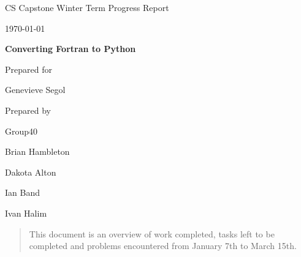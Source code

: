 \documentclass[onecolumn, draftclsnofoot,10pt, compsoc]{IEEEtran}
\def \CapstoneTeamName{The Cleverly Named Team}
\def \CapstoneTeamNumber{40}
\def \GroupMemberOne{Brian Hambleton}
\def \GroupMemberTwo{Dakota Alton}
\def \GroupMemberThree{Ian Band}
\def \GroupMemberFour{Ivan Halim}
\def \CapstoneProjectName{Converting Fortran to Python}
\def \CapstoneSponsorPerson{Genevieve Segol}
\def \DocType{Winter Term Progress Report}
\newcommand{\NameSigPair}[1]{\par
\makebox[2.75in][r]{#1} \hfil 	\makebox[3.25in]{\makebox[2.25in]{\hrulefill} \hfill		\makebox[.75in]{\hrulefill}}
\par\vspace{-12pt} \textit{\tiny\noindent
\makebox[2.75in]{} \hfil		\makebox[3.25in]{\makebox[2.25in][r]{Signature} \hfill	\makebox[.75in][r]{Date}}}}
\renewcommand{\NameSigPair}[1]{#1}
\begin{document}
\begin{titlepage}
    \begin{singlespace}
        \hfill 
        \par\vspace{.2in}
        \centering
        \scshape{
            \huge CS Capstone \DocType \par
            {\large\today}\par
            \vspace{.5in}
            \textbf{\Huge\CapstoneProjectName}\par
            \vfill
            {\large Prepared for}\par
            {\Huge\NameSigPair{\CapstoneSponsorPerson}\par}
            {\large Prepared by }\par
            Group\CapstoneTeamNumber\par
            \vspace{5pt}
            {\Large
                \NameSigPair{\GroupMemberOne}\par
                \NameSigPair{\GroupMemberTwo}\par
                \NameSigPair{\GroupMemberThree}\par
                \NameSigPair{\GroupMemberFour}\par
            }
            \vspace{20pt}
        }
        \begin{abstract}  
        This document is an overview of work completed, tasks left to be completed and problems encountered from January 7th to March 15th.
        \end{abstract}     
    \end{singlespace}
\end{titlepage}
\newpage
{}
\tableofcontents
\clearpage
\end{document}
